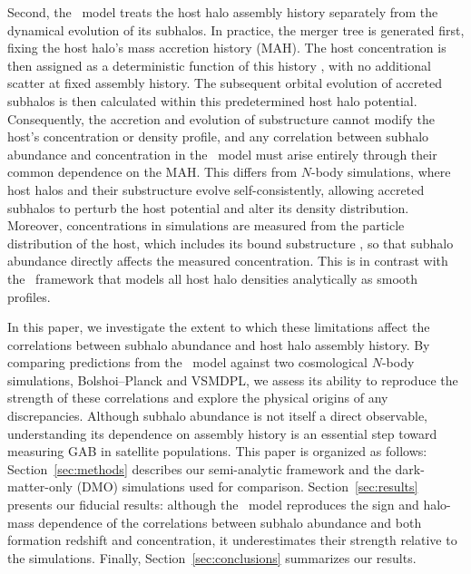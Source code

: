 \documentclass[twocolumn,apj,numberedappendix,twocolappendix,iop]{openjournal}
\begin{document}
Second, the \SatGen\ model treats the host halo assembly history separately from the dynamical evolution of its subhalos. In practice, the merger tree is generated first, fixing the host halo's mass accretion history (MAH). The host concentration is then assigned as a deterministic function of this history \citep{Zhao.etal.09}, with no additional scatter at fixed assembly history. The subsequent orbital evolution of accreted subhalos is then calculated within this predetermined host halo potential. Consequently, the accretion and evolution of substructure cannot modify the host's concentration or density profile, and any correlation between subhalo abundance and concentration in the \SatGen\ model must arise entirely through their common dependence on the MAH. This differs from $N$-body simulations, where host halos and their substructure evolve self-consistently, allowing accreted subhalos to perturb the host potential and alter its density distribution. Moreover, concentrations in simulations are measured from the particle distribution of the host, which includes its bound substructure \citep{Behroozi.etal.13a, Prada.etal.12, Wang.etal.20, Fielder.etal.20, Mezini.etal.23}, so that subhalo abundance directly affects the measured concentration. This is in contrast with the \SatGen\ framework that models all host halo densities analytically as smooth profiles.

In this paper, we investigate the extent to which these limitations affect the correlations between subhalo abundance and host halo assembly history. By comparing predictions from the \SatGen\ model against two cosmological $N$-body simulations, Bolshoi--Planck and VSMDPL, we assess its ability to reproduce the strength of these correlations and explore the physical origins of any discrepancies. Although subhalo abundance is not itself a direct observable, understanding its dependence on assembly history is an essential step toward measuring GAB in satellite populations. This paper is organized as follows: Section~\ref{sec:methods} describes our semi-analytic framework and the dark-matter-only (DMO) simulations used for comparison. Section~\ref{sec:results} presents our fiducial results: although the \SatGen\ model reproduces the sign and halo-mass dependence of the correlations between subhalo abundance and both formation redshift and concentration, it underestimates their strength relative to the simulations.   Finally, Section~\ref{sec:conclusions} summarizes our results.
\end{document}
